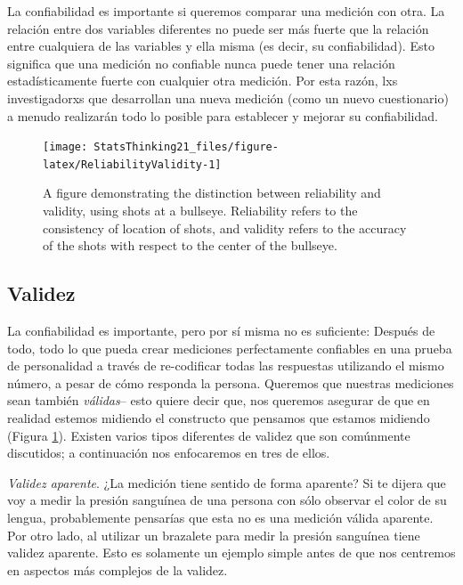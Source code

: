 \documentclass[
  12pt,
]{book}
\theoremstyle{definition}
\theoremstyle{definition}
\theoremstyle{definition}
\theoremstyle{remark}
\begin{document}
La confiabilidad es importante si queremos comparar una medición con otra. La relación entre dos variables diferentes no puede ser más fuerte que la relación entre cualquiera de las variables y ella misma (es decir, su confiabilidad). Esto significa que una medición no confiable nunca puede tener una relación estadísticamente fuerte con cualquier otra medición. Por esta razón, lxs investigadorxs que desarrollan una nueva medición (como un nuevo cuestionario) a menudo realizarán todo lo posible para establecer y mejorar su confiabilidad.

\begin{figure}
\texttt{[image: StatsThinking21\_files/figure-latex/ReliabilityValidity-1]} \caption{A figure demonstrating the distinction between reliability and validity, using shots at a bullseye. Reliability refers to the consistency of location of shots, and validity refers to the accuracy of the shots with respect to the center of the bullseye. }\label{fig:ReliabilityValidity}
\end{figure}

\hypertarget{validez}{%
\subsection{Validez}\label{validez}}

La confiabilidad es importante, pero por sí misma no es suficiente: Después de todo, todo lo que pueda crear mediciones perfectamente confiables en una prueba de personalidad a través de re-codificar todas las respuestas utilizando el mismo número, a pesar de cómo responda la persona. Queremos que nuestras mediciones sean también \emph{válidas}-- esto quiere decir que, nos queremos asegurar de que en realidad estemos midiendo el constructo que pensamos que estamos midiendo (Figura \ref{fig:ReliabilityValidity}). Existen varios tipos diferentes de validez que son comúnmente discutidos; a continuación nos enfocaremos en tres de ellos.

\emph{Validez aparente}. ¿La medición tiene sentido de forma aparente? Si te dijera que voy a medir la presión sanguínea de una persona con sólo observar el color de su lengua, probablemente pensarías que esta no es una medición válida aparente. Por otro lado, al utilizar un brazalete para medir la presión sanguínea tiene validez aparente. Esto es solamente un ejemplo simple antes de que nos centremos en aspectos más complejos de la validez.
\end{document}
